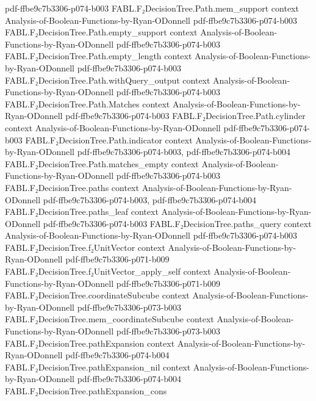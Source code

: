 \begin{theorem}
  {pdf-ffbe9c7b3306-p074-b003}
\proofstep
  {FABL.F₂DecisionTree.Path.mem_support}
  {context}
  {Analysis-of-Boolean-Functions-by-Ryan-ODonnell}
  {pdf-ffbe9c7b3306-p074-b003}
\proofstep
  {FABL.F₂DecisionTree.Path.empty_support}
  {context}
  {Analysis-of-Boolean-Functions-by-Ryan-ODonnell}
  {pdf-ffbe9c7b3306-p074-b003}
\proofstep
  {FABL.F₂DecisionTree.Path.empty_length}
  {context}
  {Analysis-of-Boolean-Functions-by-Ryan-ODonnell}
  {pdf-ffbe9c7b3306-p074-b003}
\proofstep
  {FABL.F₂DecisionTree.Path.withQuery_output}
  {context}
  {Analysis-of-Boolean-Functions-by-Ryan-ODonnell}
  {pdf-ffbe9c7b3306-p074-b003}
\proofstep
  {FABL.F₂DecisionTree.Path.Matches}
  {context}
  {Analysis-of-Boolean-Functions-by-Ryan-ODonnell}
  {pdf-ffbe9c7b3306-p074-b003}
\proofstep
  {FABL.F₂DecisionTree.Path.cylinder}
  {context}
  {Analysis-of-Boolean-Functions-by-Ryan-ODonnell}
  {pdf-ffbe9c7b3306-p074-b003}
\proofstep
  {FABL.F₂DecisionTree.Path.indicator}
  {context}
  {Analysis-of-Boolean-Functions-by-Ryan-ODonnell}
  {pdf-ffbe9c7b3306-p074-b003,
    pdf-ffbe9c7b3306-p074-b004}
\proofstep
  {FABL.F₂DecisionTree.Path.matches_empty}
  {context}
  {Analysis-of-Boolean-Functions-by-Ryan-ODonnell}
  {pdf-ffbe9c7b3306-p074-b003}
\proofstep
  {FABL.F₂DecisionTree.paths}
  {context}
  {Analysis-of-Boolean-Functions-by-Ryan-ODonnell}
  {pdf-ffbe9c7b3306-p074-b003,
    pdf-ffbe9c7b3306-p074-b004}
\proofstep
  {FABL.F₂DecisionTree.paths_leaf}
  {context}
  {Analysis-of-Boolean-Functions-by-Ryan-ODonnell}
  {pdf-ffbe9c7b3306-p074-b003}
\proofstep
  {FABL.F₂DecisionTree.paths_query}
  {context}
  {Analysis-of-Boolean-Functions-by-Ryan-ODonnell}
  {pdf-ffbe9c7b3306-p074-b003}
\proofstep
  {FABL.F₂DecisionTree.f₂UnitVector}
  {context}
  {Analysis-of-Boolean-Functions-by-Ryan-ODonnell}
  {pdf-ffbe9c7b3306-p071-b009}
\proofstep
  {FABL.F₂DecisionTree.f₂UnitVector_apply_self}
  {context}
  {Analysis-of-Boolean-Functions-by-Ryan-ODonnell}
  {pdf-ffbe9c7b3306-p071-b009}
\proofstep
  {FABL.F₂DecisionTree.coordinateSubcube}
  {context}
  {Analysis-of-Boolean-Functions-by-Ryan-ODonnell}
  {pdf-ffbe9c7b3306-p073-b003}
\proofstep
  {FABL.F₂DecisionTree.mem_coordinateSubcube}
  {context}
  {Analysis-of-Boolean-Functions-by-Ryan-ODonnell}
  {pdf-ffbe9c7b3306-p073-b003}
\proofstep
  {FABL.F₂DecisionTree.pathExpansion}
  {context}
  {Analysis-of-Boolean-Functions-by-Ryan-ODonnell}
  {pdf-ffbe9c7b3306-p074-b004}
\proofstep
  {FABL.F₂DecisionTree.pathExpansion_nil}
  {context}
  {Analysis-of-Boolean-Functions-by-Ryan-ODonnell}
  {pdf-ffbe9c7b3306-p074-b004}
\proofstep
  {FABL.F₂DecisionTree.pathExpansion_cons}

\end{theorem}
